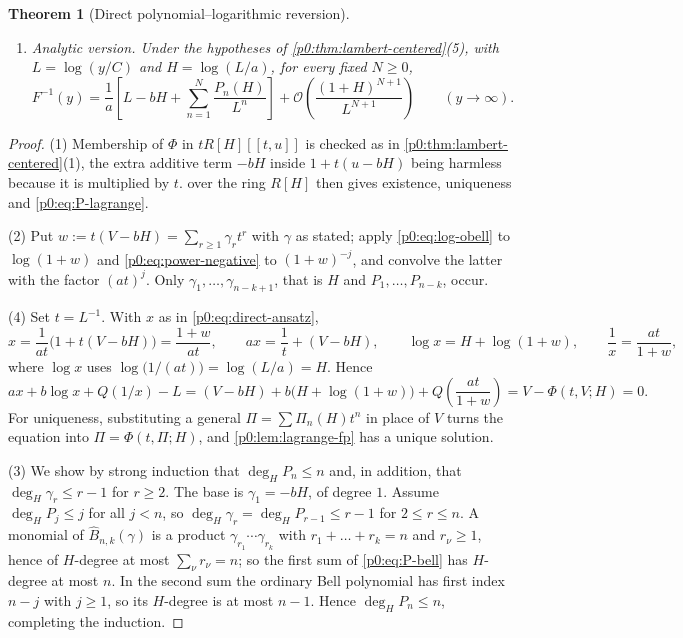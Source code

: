 \documentclass[11pt,a4paper,oneside]{book}
\theoremstyle{plain}
\newtheorem{theorem}{Theorem}[chapter]
\theoremstyle{definition}
\theoremstyle{remark}
\newcommand{\bigO}{\mathcal{O}}
\newcommand{\OB}{\widehat{B}}
\begin{document}
\begin{theorem}[Direct polynomial--logarithmic reversion]
\begin{enumerate}
      $x=a^{-1}\bigl[L-bH+\sum_{n\ge1}\Pi_n(H)L^{-n}\bigr]$,
      with $\Pi_n\in R[H]$, that solves the equation coefficientwise.
\item \emph{Analytic version.}  Under the hypotheses of
      \cref{p0:thm:lambert-centered}(5), with $L=\log(y/C)$ and
      $H=\log(L/a)$, for every fixed $N\ge0$,
      \begin{equation}\label{p0:eq:direct-asymptotic}
       F^{-1}(y)=\frac1a\left[L-bH+\sum_{n=1}^{N}\frac{P_n(H)}{L^{n}}\right]
        +\bigO\!\left(\frac{(1+H)^{N+1}}{L^{N+1}}\right)
       \qquad(y\to\infty).
      \end{equation}
\end{enumerate}
\end{theorem}

\begin{proof}
(1) Membership of $\Phi$ in $tR[H][[t,u]]$ is checked as in
\cref{p0:thm:lambert-centered}(1), the extra additive term $-bH$ inside
$1+t(u-bH)$ being harmless because it is multiplied by $t$.
 over the ring $R[H]$ then gives existence,
uniqueness and \eqref{p0:eq:P-lagrange}.

(2) Put $w:=t(V-bH)=\sum_{r\ge1}\gamma_rt^r$ with $\gamma$ as stated; apply
\eqref{p0:eq:log-obell} to $\log(1+w)$ and \eqref{p0:eq:power-negative} to
$(1+w)^{-j}$, and convolve the latter with the factor $(at)^j$.  Only
$\gamma_1,\dots,\gamma_{n-k+1}$, that is $H$ and $P_1,\dots,P_{n-k}$, occur.

(4) Set $t=L^{-1}$.  With $x$ as in \eqref{p0:eq:direct-ansatz},
\[
 x=\frac1{at}\bigl(1+t(V-bH)\bigr)=\frac{1+w}{at},
 \qquad ax=\frac1t+(V-bH),\qquad
 \log x=H+\log(1+w),\qquad \frac1x=\frac{at}{1+w},
\]
where $\log x$ uses $\log\bigl(1/(at)\bigr)=\log(L/a)=H$.  Hence
\[
 ax+b\log x+Q(1/x)-L
 =(V-bH)+b\bigl(H+\log(1+w)\bigr)+Q\!\left(\frac{at}{1+w}\right)
 =V-\Phi(t,V;H)=0 .
\]
For uniqueness, substituting a general $\Pi=\sum\Pi_n(H)t^n$ in place of $V$
turns the equation into $\Pi=\Phi(t,\Pi;H)$, and
\cref{p0:lem:lagrange-fp} has a unique solution.

(3) We show by strong induction that $\deg_HP_n\le n$ and, in addition, that
$\deg_H\gamma_r\le r-1$ for $r\ge2$.  The base is
$\gamma_1=-bH$, of degree $1$.  Assume $\deg_HP_j\le j$ for all $j<n$, so
$\deg_H\gamma_r=\deg_HP_{r-1}\le r-1$ for $2\le r\le n$.  A monomial of
$\OB_{n,k}(\gamma)$ is a product $\gamma_{r_1}\cdots\gamma_{r_k}$ with
$r_1+\dots+r_k=n$ and $r_\nu\ge1$, hence of $H$-degree at most
$\sum_\nu r_\nu=n$; so the first sum of \eqref{p0:eq:P-bell} has $H$-degree at
most $n$.  In the second sum the ordinary Bell polynomial has first index
$n-j$ with $j\ge1$, so its $H$-degree is at most $n-1$.  Hence
$\deg_HP_n\le n$, completing the induction.


\end{proof}
\end{document}
